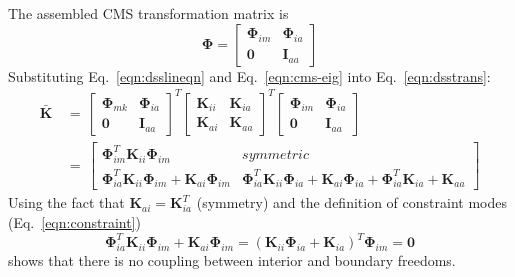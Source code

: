 \documentclass[11pt,openany,twoside]{book}
\numberwithin{equation}{section}		%
\newcommand{\Matrix}[1]{\boldsymbol{#1}}
\newcommand{\Eqn}[1]{Eq.\ \ref{#1}}  %
\begin{document}
The assembled CMS transformation matrix is
\begin{equation}
\Matrix{\Phi} = \left[
\begin{array}{cc}
   \Matrix{\Phi}_{im} & \Matrix{\Phi}_{ia} \\
   \Matrix{0} & \Matrix{I}_{aa}
\end{array}
\right]			\nonumber
\end{equation}
Substituting \Eqn{eqn:dsslineqn} and \Eqn{eqn:cms-eig} into \Eqn{eqn:dsstrans}:
\begin{equation}
\begin{split}
\Matrix{\bar{K}} & \, = \, \left[
        \begin{array}{cc}
                \Matrix{\Phi}_{mk} & \Matrix{\Phi}_{ia} \\
                \Matrix{0} & \Matrix{I}_{aa}
        \end{array}
        \right]^T \left[
        \begin{array}{cc}
                \Matrix{K}_{ii} & \Matrix{K}_{ia} \\
                \Matrix{K}_{ai} & \Matrix{K}_{aa}
        \end{array}
        \right]^T \left[
        \begin{array}{cc}
                \Matrix{\Phi}_{im} & \Matrix{\Phi}_{ia} \\
                \Matrix{0} & \Matrix{I}_{aa}
        \end{array}
        \right]                                 \\
 & \, = \, \left[
\begin{array}{cc}
   \Matrix{\Phi}_{im}^T \Matrix{K}_{ii} \Matrix{\Phi}_{im} & symmetric \\
   \Matrix{\Phi}_{ia}^T \Matrix{K}_{ii} \Matrix{\Phi}_{im} + \Matrix{K}_{ai} \Matrix{\Phi}_{im} &
                        \Matrix{\Phi}_{ia}^T \Matrix{K}_{ii} \Matrix{\Phi}_{ia} +
                        \Matrix{K}_{ai} \Matrix{\Phi}_{ia} + \Matrix{\Phi}_{ia}^T \Matrix{K}_{ia} + \Matrix{K}_{aa}
\end{array}
\right]
\end{split}		\nonumber
\end{equation}
Using the fact that $\Matrix{K}_{ai} = \Matrix{K}_{ia}^T$ (symmetry)
and the definition of constraint modes (\Eqn{eqn:constraint})
\begin{equation}
\Matrix{\Phi}_{ia}^T \Matrix{K}_{ii} \Matrix{\Phi}_{im} + \Matrix{K}_{ai} \Matrix{\Phi}_{im} =
                \left( \Matrix{K}_{ii} \Matrix{\Phi}_{ia} + \Matrix{K}_{ia} \right)^T \Matrix{\Phi}_{im} = \Matrix{0}		\nonumber
\end{equation}
shows that there is no coupling between interior and boundary freedoms.
\end{document}

